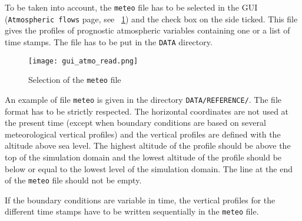 {{To be taken into account, the \texttt{meteo} file has to be selected in the GUI
(\texttt{Atmospheric flows} page, see \figurename~\ref{fig:meteo}) and the check
box on the side ticked. This file gives the profiles of prognostic atmospheric
variables containing one or a list of time stamps. The file has to be put in the
\texttt{DATA} directory.
%
\begin{figure}[htbp]
\centerline{\texttt{[image: gui\_atmo\_read.png]}}
\caption{Selection of the \texttt{meteo} file}
\label{fig:meteo}
\end{figure}
%
An example of file \texttt{meteo} is given in the directory
\texttt{DATA/REFERENCE/}. The file format has to be strictly respected.
The horizontal coordinates are not used at the present time (except when
boundary conditions are based on several meteorological vertical profiles)
and the vertical profiles are defined with the altitude above sea level. The
highest altitude of the profile should be above the top of the simulation domain
and the lowest altitude of the profile should be below or equal to the lowest
level of the simulation domain. The line at the end of the \texttt{meteo} file
should not be empty.

If the boundary conditions are variable in time, the vertical profiles for
the different time stamps have to be written sequentially in the \texttt{meteo}
file.

}}

